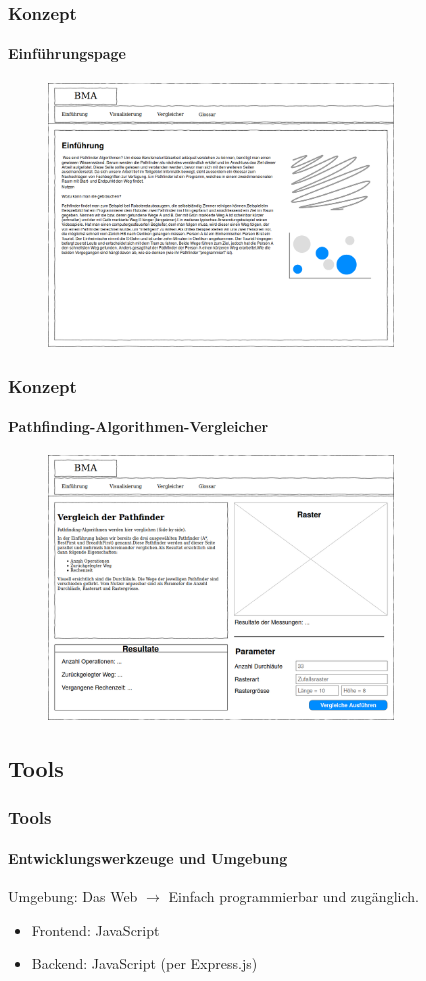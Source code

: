 \documentclass[professionalfont,serif,german]{beamer}
\begin{document}
\begin{frame}
  \frametitle{Konzept}
  \framesubtitle{Einführungspage}
  \begin{figure}
    \includegraphics[height=7cm]{img/einfuehrung1.png}
  \end{figure}
\end{frame}

\begin{frame}
  \frametitle{Konzept}
  \framesubtitle{Pathfinding-Algorithmen-Vergleicher}
  \begin{figure}
    \includegraphics[height=7cm]{img/konzept1.png}
  \end{figure}
\end{frame}


\begin{frame}
  \section{Tools}
  \frametitle{Tools}
  \framesubtitle{Entwicklungswerkzeuge und Umgebung}
  Umgebung: Das Web $\rightarrow$ Einfach programmierbar und zugänglich.
  \begin{itemize}
    \item Frontend: JavaScript 
    \item Backend: JavaScript (per Express.js)
  \end{itemize}
\end{frame}
\end{document}
